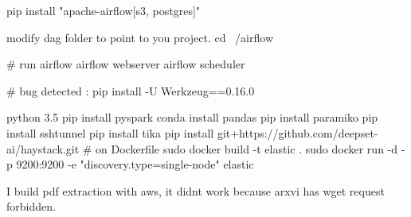 pip install "apache-airflow[s3, postgres]"

modify dag folder to point to you project.
cd ~/airflow

# run airflow
airflow webserver
airflow scheduler

# bug detected :
pip install -U Werkzeug==0.16.0


python 3.5
pip install pyspark 
conda install pandas 
pip install paramiko
pip install sshtunnel
pip install tika
pip install git+https://github.com/deepset-ai/haystack.git
# on Dockerfile
sudo docker build -t elastic .
sudo docker run -d -p 9200:9200 -e "discovery.type=single-node" elastic


I build pdf extraction with aws, it didnt work because arxvi has wget request
forbidden.